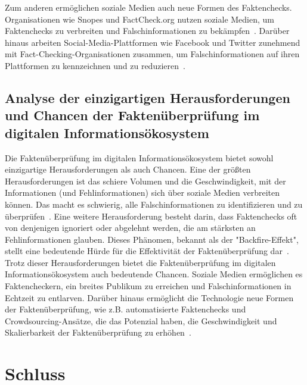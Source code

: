 \documentclass[a4paper,listof=totoc,bibliography=totoc]{scrartcl}
\begin{document}
Zum anderen ermöglichen soziale Medien auch neue Formen des Faktenchecks. Organisationen wie Snopes und FactCheck.org nutzen soziale Medien, um 
Faktenchecks zu verbreiten und Falschinformationen zu bekämpfen~\cite{Fung2012}. Darüber hinaus arbeiten Social-Media-Plattformen wie Facebook und 
Twitter zunehmend mit Fact-Checking-Organisationen zusammen, um Falschinformationen auf ihren Plattformen zu kennzeichnen und zu reduzieren~\cite{Pennycook2020}.

\subsection{Analyse der einzigartigen Herausforderungen und Chancen der Faktenüberprüfung im digitalen Informationsökosystem}

Die Faktenüberprüfung im digitalen Informationsökosystem bietet sowohl einzigartige Herausforderungen als auch Chancen. Eine der größten 
Herausforderungen ist das schiere Volumen und die Geschwindigkeit, mit der Informationen (und Fehlinformationen) sich über soziale Medien verbreiten 
können. Das macht es schwierig, alle Falschinformationen zu identifizieren und zu überprüfen~\cite{Vosoughi2018}.
Eine weitere Herausforderung besteht darin, dass Faktenchecks oft von denjenigen ignoriert oder abgelehnt werden, die am stärksten 
an Fehlinformationen glauben. Dieses Phänomen, bekannt als der "Backfire-Effekt", stellt eine bedeutende Hürde für die Effektivität der Faktenüberprüfung dar~\cite{nyhan2010}.
Trotz dieser Herausforderungen bietet die Faktenüberprüfung im digitalen Informationsökosystem auch bedeutende Chancen. Soziale Medien ermöglichen es Faktencheckern, ein breites 
Publikum zu erreichen und Falschinformationen in Echtzeit zu entlarven. Darüber hinaus ermöglicht die Technologie neue Formen der Faktenüberprüfung, wie z.B. automatisierte 
Faktenchecks und Crowdsourcing-Ansätze, die das Potenzial haben, die Geschwindigkeit und Skalierbarkeit der Faktenüberprüfung zu erhöhen~\cite{Hassan2015}.

\section{Schluss}
\end{document}
